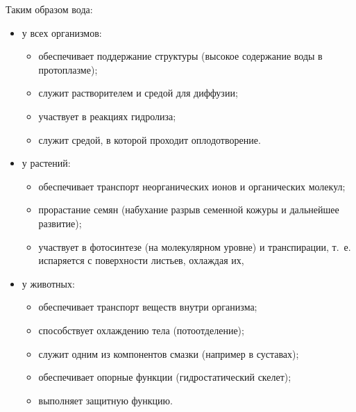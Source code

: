 \documentclass{bmstu}
\begin{document}
Таким образом вода:

\begin{itemize}
    \item у всех организмов:
        \begin{itemize}
            \item обеспечивает поддержание структуры (высокое содержание воды в
                протоплазме);
            \item служит растворителем и средой для диффузии;
            \item участвует в реакциях гидролиза;
            \item служит средой, в которой проходит оплодотворение.
        \end{itemize}
    \item у растений:
        \begin{itemize}
            \item обеспечивает транспорт неорганических ионов и органических
                молекул;
            \item прорастание семян (набухание разрыв семенной кожуры и
                дальнейшее развитие);
            \item участвует в фотосинтезе (на молекулярном уровне) и
                транспирации, т.~е. испаряется с поверхности листьев, охлаждая
                их,
        \end{itemize}
    \item у животных: 
        \begin{itemize}
            \item обеспечивает транспорт веществ внутри организма;
            \item способствует охлаждению тела (потоотделение);
            \item служит одним из компонентов смазки (например в суставах);
            \item обеспечивает опорные функции (гидростатический скелет);
            \item выполняет защитную функцию.
        \end{itemize}
\end{itemize}
\end{document}
